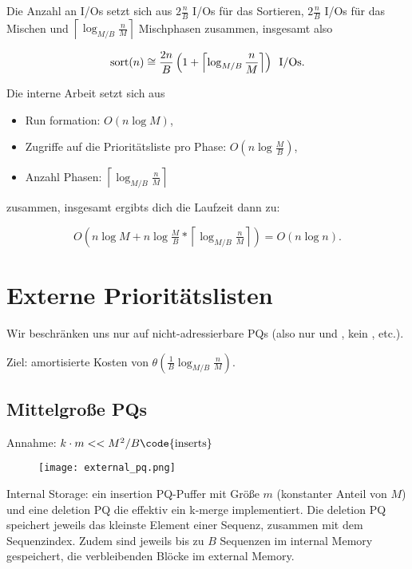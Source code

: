 Die Anzahl an I/Os setzt sich aus \( 2\tfrac{n}{B} \) I/Os für das Sortieren, \( 2\tfrac{n}{B} \) I/Os für das Mischen und \( \left\lceil \log_{M/B} \tfrac{n}{M} \right\rceil \) Mischphasen zusammen, insgesamt also

\begin{equation*} 
  \text{sort}(n) \cong \frac{2n}{B}\left( 1 + \left\lceil \log_{M/B} \frac{n}{M} \right\rceil \right) \enskip \text{I/Os.}
\end{equation*}

Die interne Arbeit setzt sich aus
\begin{itemize}
  \item Run formation: \( O(n\log M) \),
  \item Zugriffe auf die Prioritätsliste pro Phase: \( O\left( n\log \tfrac{M}{B} \right) \),
  \item Anzahl Phasen: \( \left\lceil \log_{M/B} \tfrac{n}{M} \right\rceil \)
\end{itemize}
zusammen, insgesamt ergibts dich die Laufzeit dann zu:

\begin{equation*}
  O\left( n \log M + n\log \tfrac{M}{B} * \left\lceil \log_{M/B} \tfrac{n}{M} \right\rceil \right) = O(n\log n)\text{.}
\end{equation*}

\section{Externe Prioritätslisten}
Wir beschränken uns nur auf nicht-adressierbare PQs (also nur  und , kein , etc.).

Ziel: amortisierte Kosten von $\theta(\frac{1}{B} \log_{M/B} \frac{n}{M})$.

\subsection{Mittelgroße PQs}
Annahme: $k\cdot m << M^2/B \text{\code{inserts}}$ 


\begin{figure}[H]
  \texttt{[image: external\_pq.png]}
\end{figure}



Internal Storage: ein insertion PQ-Puffer mit Größe $m$ (konstanter Anteil von $M$) und eine deletion PQ die effektiv ein k-merge implementiert. Die deletion PQ speichert jeweils das kleinste Element einer Sequenz, zusammen mit dem Sequenzindex. Zudem sind jeweils bis zu $B$ Sequenzen im internal Memory gespeichert, die verbleibenden Blöcke im external Memory.
 
